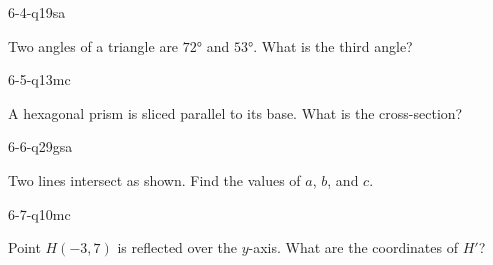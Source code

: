 \begin{practiceQuestion}{6-4-q19}{sa}
\begin{questionText}
Two angles of a triangle are $72°$ and $53°$. What is the third angle?
\end{questionText}
\end{practiceQuestion}

\begin{practiceQuestion}{6-5-q13}{mc}
\begin{questionText}
A hexagonal prism is sliced parallel to its base. What is the cross-section?
\end{questionText}
\end{practiceQuestion}

\begin{practiceQuestion}{6-6-q29}{gsa}
\begin{questionText}
Two lines intersect as shown. Find the values of $a$, $b$, and $c$.

\begin{center}
\end{center}
\end{questionText}
\end{practiceQuestion}

\begin{practiceQuestion}{6-7-q10}{mc}
\begin{questionText}
Point $H(-3, 7)$ is reflected over the $y$-axis. What are the coordinates of $H'$?
\end{questionText}
\end{practiceQuestion}

